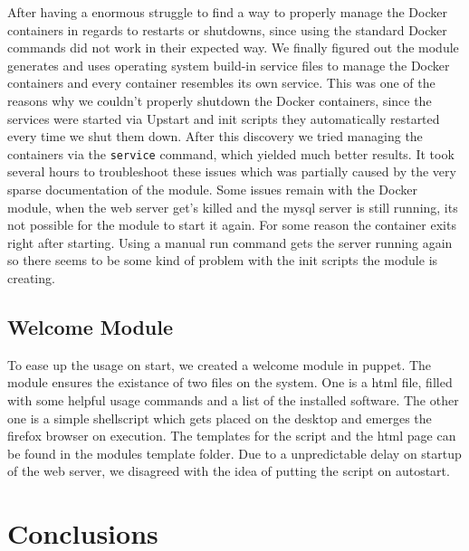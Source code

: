 After having a enormous struggle to find a way to properly manage the Docker containers in regards to restarts or shutdowns, since using the standard Docker commands did not work in their expected way. We finally figured out the module generates and uses operating system build-in service files to manage the Docker containers and every container resembles its own service. This was one of the reasons why we couldn't properly shutdown the Docker containers, since the services were started via Upstart and init scripts they automatically restarted every time we shut them down. After this discovery we tried managing the containers via the \verb|service| command, which yielded much better results. It took several hours to troubleshoot these issues which was partially caused by the very sparse documentation of the module. Some issues remain with the Docker module, when the web server get's killed and the mysql server is still running, its not possible for the module to start it again. For some reason the container exits right after starting. Using a manual run command gets the server running again so there seems to be some kind of problem with the init scripts the module is creating.

\subsection{Welcome Module}
To ease up the usage on start, we created a welcome module in puppet. The module ensures the existance of two files on the system. One is a html file, filled with some helpful usage commands and a list of the installed software. The other one is a simple shellscript which gets placed on the desktop and emerges the firefox browser on execution. The templates for the script and the html page can be found in the modules template folder. Due to a unpredictable delay on startup of the web server, we disagreed with the idea of putting the script on autostart.




\section{Conclusions}

